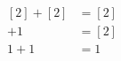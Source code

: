 \documentclass[preview]{standalone}
\begin{document}
\begin{align*}
\begin{aligned}[2] + [2] &= [2] \\[1] + 1 &= [2] \\1 + 1 &= 1 \end{aligned}
\end{align*}
\end{document}

